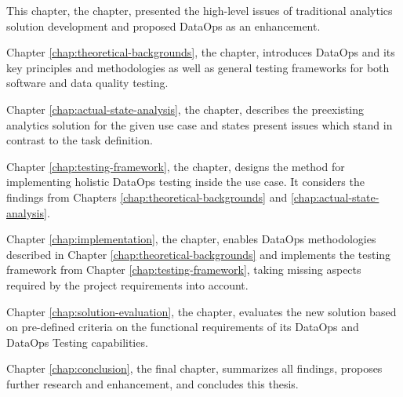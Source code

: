 This chapter, the  chapter, presented the high-level issues of traditional analytics solution development and proposed DataOps as an enhancement.

Chapter \ref{chap:theoretical-backgrounds}, the  chapter, introduces DataOps and its key principles and methodologies as well as general testing frameworks for both software and data quality testing.

Chapter \ref{chap:actual-state-analysis}, the  chapter, describes the preexisting analytics solution for the given use case and states present issues which stand in contrast to the task definition.

Chapter \ref{chap:testing-framework}, the  chapter, designs the method for implementing holistic DataOps testing inside the use case. It considers the findings from Chapters \ref{chap:theoretical-backgrounds} and \ref{chap:actual-state-analysis}.

Chapter \ref{chap:implementation}, the  chapter, enables DataOps methodologies described in Chapter \ref{chap:theoretical-backgrounds} and implements the testing framework from Chapter \ref{chap:testing-framework}, taking missing aspects required by the project requirements into account.

Chapter \ref{chap:solution-evaluation}, the  chapter, evaluates the new solution based on pre-defined criteria on the functional requirements of its DataOps and DataOps Testing capabilities.

Chapter \ref{chap:conclusion}, the final  chapter, summarizes all findings, proposes further research and enhancement, and concludes this thesis.
